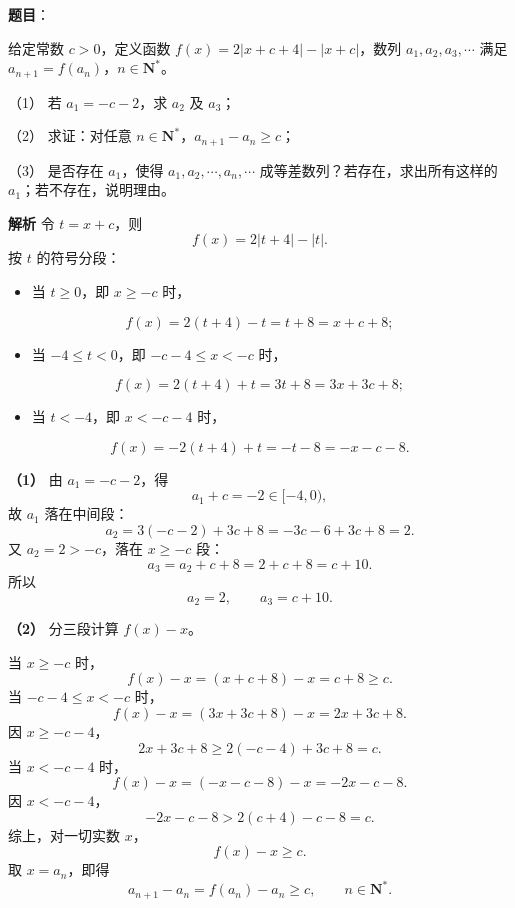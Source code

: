 \begin{answer}

\textbf{题目}：

给定常数 $c>0$，定义函数 $f(x)=2|x+c+4|-|x+c|$，数列 $a_1,a_2,a_3,\cdots$ 满足 $a_{n+1}=f(a_n)$，$n\in\mathbf N^*$。

（1） 若 $a_1=-c-2$，求 $a_2$ 及 $a_3$；

（2） 求证：对任意 $n\in\mathbf N^*$，$a_{n+1}-a_n\geqslant c$；

（3） 是否存在 $a_1$，使得 $a_1,a_2,\cdots,a_n,\cdots$ 成等差数列？若存在，求出所有这样的 $a_1$；若不存在，说明理由。

\textbf{解析}
令 $t=x+c$，则
\nopagebreak[4]
\[f(x)=2|t+4|-|t|.\]
按 $t$ 的符号分段：

\begin{itemize}
\item 当 $t\geqslant0$，即 $x\geqslant-c$ 时，
\end{itemize}
\nopagebreak[4]
\[f(x)=2(t+4)-t=t+8=x+c+8;\]
\begin{itemize}
\item 当 $-4\leqslant t<0$，即 $-c-4\leqslant x<-c$ 时，
\end{itemize}
\nopagebreak[4]
\[f(x)=2(t+4)+t=3t+8=3x+3c+8;\]
\begin{itemize}
\item 当 $t<-4$，即 $x<-c-4$ 时，
\end{itemize}
\nopagebreak[4]
\[f(x)=-2(t+4)+t=-t-8=-x-c-8.\]

\textbf{（1）} 由 $a_1=-c-2$，得
\nopagebreak[4]
\[a_1+c=-2\in[-4,0),\]
故 $a_1$ 落在中间段：
\nopagebreak[4]
\[a_2=3(-c-2)+3c+8=-3c-6+3c+8=2.\]
又 $a_2=2>-c$，落在 $x\geqslant-c$ 段：
\nopagebreak[4]
\[a_3=a_2+c+8=2+c+8=c+10.\]
所以
\nopagebreak[4]
\[a_2=2,\qquad a_3=c+10.\]

\textbf{（2）} 分三段计算 $f(x)-x$。

当 $x\geqslant-c$ 时，
\nopagebreak[4]
\[f(x)-x=(x+c+8)-x=c+8\geqslant c.\]
当 $-c-4\leqslant x<-c$ 时，
\nopagebreak[4]
\[f(x)-x=(3x+3c+8)-x=2x+3c+8.\]
因 $x\geqslant-c-4$，
\nopagebreak[4]
\[2x+3c+8\geqslant2(-c-4)+3c+8=c.\]
当 $x<-c-4$ 时，
\nopagebreak[4]
\[f(x)-x=(-x-c-8)-x=-2x-c-8.\]
因 $x<-c-4$，
\nopagebreak[4]
\[-2x-c-8>2(c+4)-c-8=c.\]
综上，对一切实数 $x$，
\nopagebreak[4]
\[f(x)-x\geqslant c.\]
取 $x=a_n$，即得
\nopagebreak[4]
\[a_{n+1}-a_n=f(a_n)-a_n\geqslant c,\qquad n\in\mathbf N^*.\]


\end{answer}
